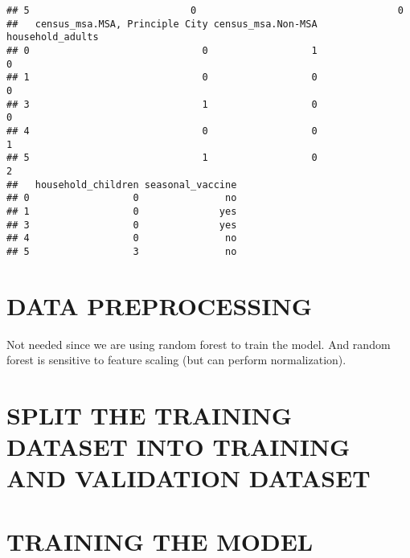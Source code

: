 \documentclass[
]{article}
\newenvironment{Shaded}{\begin{snugshade}}{\end{snugshade}}
\newcommand{\AttributeTok}[1]{\textcolor[rgb]{0.13,0.29,0.53}{#1}}
\newcommand{\CommentTok}[1]{\textcolor[rgb]{0.56,0.35,0.01}{\textit{#1}}}
\newcommand{\ConstantTok}[1]{\textcolor[rgb]{0.56,0.35,0.01}{#1}}
\newcommand{\DecValTok}[1]{\textcolor[rgb]{0.00,0.00,0.81}{#1}}
\newcommand{\FloatTok}[1]{\textcolor[rgb]{0.00,0.00,0.81}{#1}}
\newcommand{\FunctionTok}[1]{\textcolor[rgb]{0.13,0.29,0.53}{\textbf{#1}}}
\newcommand{\NormalTok}[1]{#1}
\newcommand{\OtherTok}[1]{\textcolor[rgb]{0.56,0.35,0.01}{#1}}
\newcommand{\SpecialCharTok}[1]{\textcolor[rgb]{0.81,0.36,0.00}{\textbf{#1}}}
\begin{document}
\begin{verbatim}
## 5                            0                                   0
##   census_msa.MSA, Principle City census_msa.Non-MSA household_adults
## 0                              0                  1                0
## 1                              0                  0                0
## 3                              1                  0                0
## 4                              0                  0                1
## 5                              1                  0                2
##   household_children seasonal_vaccine
## 0                  0               no
## 1                  0              yes
## 3                  0              yes
## 4                  0               no
## 5                  3               no
\end{verbatim}

\section{DATA PREPROCESSING}\label{data-preprocessing-1}

Not needed since we are using random forest to train the model. And
random forest is sensitive to feature scaling (but can perform
normalization).

\section{SPLIT THE TRAINING DATASET INTO TRAINING AND VALIDATION
DATASET}\label{split-the-training-dataset-into-training-and-validation-dataset-1}

\begin{Shaded}
\end{Shaded}

\section{TRAINING THE MODEL}\label{training-the-model-1}
\end{document}
